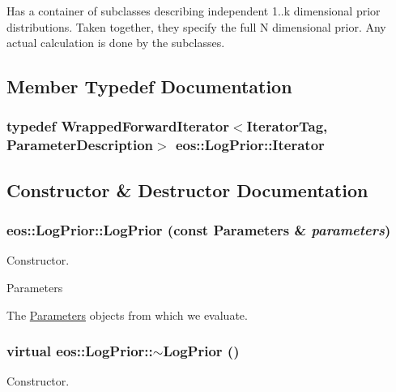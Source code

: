 Has a container of subclasses describing independent 1..k dimensional prior distributions. Taken together, they specify the full N dimensional prior. Any actual calculation is done by the subclasses. 

\subsection{Member Typedef Documentation}
\hypertarget{classeos_1_1LogPrior_a384dd9ec4424f2269e052e41ca834a3d}{
\subsubsection[{Iterator}]{\setlength{\rightskip}{0pt plus 5cm}typedef {\bf WrappedForwardIterator}$<$IteratorTag, {\bf ParameterDescription}$>$ {\bf eos::LogPrior::Iterator}}}
\label{classeos_1_1LogPrior_a384dd9ec4424f2269e052e41ca834a3d}


\subsection{Constructor \& Destructor Documentation}
\hypertarget{classeos_1_1LogPrior_ae06bbf3b7073084d135bedd818fbf988}{
\subsubsection[{LogPrior}]{\setlength{\rightskip}{0pt plus 5cm}eos::LogPrior::LogPrior (const {\bf Parameters} \& {\em parameters})}}
\label{classeos_1_1LogPrior_ae06bbf3b7073084d135bedd818fbf988}
Constructor.


\begin{DoxyParams}{Parameters}
\item[{\em parameters}]The \hyperlink{classeos_1_1Parameters}{Parameters} objects from which we evaluate. \end{DoxyParams}
\hypertarget{classeos_1_1LogPrior_affbfcbe3bf1a16aa5e696880d20e2822}{
\subsubsection[{$\sim$LogPrior}]{\setlength{\rightskip}{0pt plus 5cm}virtual eos::LogPrior::$\sim$LogPrior ()}}
\label{classeos_1_1LogPrior_affbfcbe3bf1a16aa5e696880d20e2822}
Constructor.


